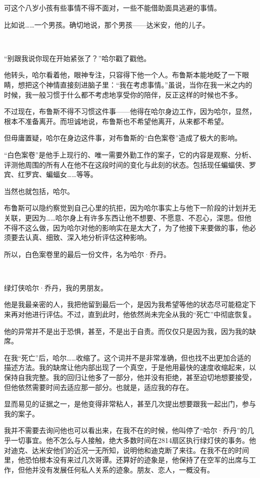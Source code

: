 \documentclass[../main]{subfiles}
\begin{document}
可这个八岁小孩有些事情不得不面对，一些不能借助面具逃避的事情。

比如说……一个男孩。确切地说，那个男孩——达米安，他的儿子。

~\

“别跟我说你现在开始紧张了？”哈尔戳了戳他。

他转头，哈尔看着他，眼神专注，只容得下他一个人。布鲁斯本能地眨了一下眼睛，想把这个神情直接刻进脑子里：“我在考虑事情。”虽说，当你在我一米之内的时候，我一般习惯于什么都不考虑地享受你的陪伴，反正这样的时候也不多。

不过现在，布鲁斯不得不习惯这件事——他得在哈尔身边工作，因为哈尔，显然，根本不准备离开。而坦诚地说，布鲁斯也不希望他离开，从来都不希望。

但毋庸置疑，哈尔在身边这件事，对布鲁斯的“白色案卷”造成了极大的影响。

“白色案卷”是他手上现行的、唯一需要外勤工作的案子，它的内容是观察、分析、评测他周围的所有人在他不在这段时间的变化与此刻的状态。包括现任蝙蝠侠、罗宾、红罗宾、蝙蝠女……等等。

当然也就包括，哈尔。

布鲁斯可以隐约察觉到自己心里的抗拒，因为哈尔事实上与他下一阶段的计划并无关联，更因为……哈尔身上有许多东西让他不想要、不愿意、不忍心，深思。但他不得不这么做，因为哈尔对他的影响实在是太大了，为了他接下来要做的事，他必须要去认真、细致、深入地分析评估这种影响。

所以，白色案卷里的最后一份文件，名为哈尔·乔丹。

~\

绿灯侠哈尔·乔丹，我的男朋友。

他是我最亲密的人，我把他留到最后一个，是因为我希望等他的状态尽可能稳定下来再对他进行评估。不过，直到此时，他依然尚未完全从我的“死亡”中彻底恢复。

他的异常并不是出于恐惧，甚至，不是出于自责。而仅仅只是因为我，因为我的缺席。

在我“死亡”后，哈尔……收缩了。这个词并不是非常准确，但也找不出更加合适的描述方法。我的缺席让他内部出现了一个真空，于是他用最快的速度收缩起来，以保持自我完整。我的回归让他多了一部分，他并没有拒绝，甚至迫切地想要接受，但他依然需要时间去适应那一部分。也就是，适应我的存在。

显而易见的证据之一，是他变得非常粘人，甚至几次提出想要跟我一起出门，参与我的案子。

我并不需要去询问他也可以看出来，在我不在的时候，他叫停了“哈尔·乔丹”的几乎一切事宜。他不怎么与人接触，绝大多数时间在2814扇区执行绿灯侠的事务。他对迪克、达米安他们的近况一无所知，说明他和迪克断了来往。在我不在的时间里，他恐怕根本没有来过几次哥谭。还算好的迹象是，他保持了在空军的出席与工作，但他并没有发展任何私人关系的迹象。朋友、恋人，一概没有。
\end{document}
